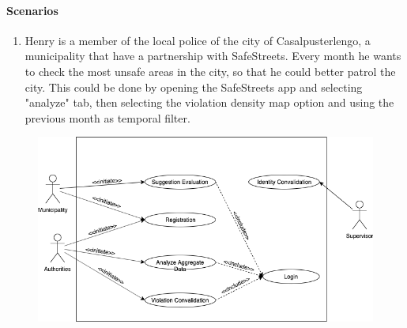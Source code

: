 \paragraph{Scenarios}
\begin{enumerate}
    \item Henry is a member of the local police of the city of Casalpusterlengo, a municipality that have a partnership with SafeStreets. Every month he wants to check the most unsafe areas in the city, so that he could better patrol the city. This could be done by opening the SafeStreets app and selecting "analyze" tab, then selecting the violation density map option and using the previous month as temporal filter.
\end{enumerate}

\begin{figure}[H]
        \centering
        \includegraphics[width=\textwidth]{Images/UseCaseThirdParty}
\end{figure}